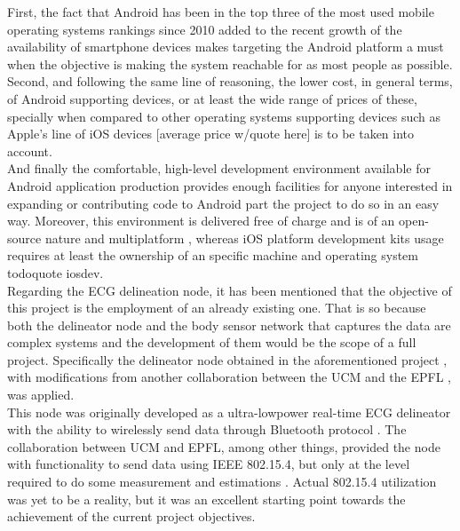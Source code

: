 		First, the fact that Android has been in the top three of the most used mobile operating systems rankings since 2010  added to the recent growth of the availability of smartphone devices  makes targeting the Android platform a must when the objective is making the system reachable for as most people as possible.\\

		Second, and following the same line of reasoning, the lower cost, in general terms, of Android supporting devices, or at least the wide range of prices of these, specially when compared to other operating systems supporting devices such as Apple's line of iOS devices [average price w/quote here] is to be taken into account.\\

		And finally the comfortable, high-level development environment available for Android application production  provides enough facilities for anyone interested in expanding or contributing code to Android part the project to do so in an easy way. Moreover, this environment is delivered free of charge and is of an open-source nature and multiplatform , whereas iOS platform development kits usage requires at least the ownership of an specific machine and operating system todo{quote iosdev}.\\

		Regarding the ECG delineation node, it has been mentioned that the objective of this project is the employment of an already existing one. That is so because both the delineator node and the body sensor network that captures the data are complex systems and the development of them would be the scope of a full project. Specifically the delineator node obtained in the aforementioned project , with modifications from another collaboration between the UCM and the EPFL , was applied.\\

		This node was originally developed as a ultra-lowpower real-time ECG delineator with the ability to wirelessly send data through Bluetooth protocol . The collaboration between UCM and EPFL, among other things, provided the node with functionality to send data using IEEE 802.15.4, but only at the level required to do some measurement and estimations . Actual 802.15.4 utilization was yet to be a reality, but it was an excellent starting point towards the achievement of the current project objectives.\\

